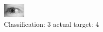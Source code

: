 \begin{figure}[h!]
\begin{center}
\includegraphics[width=0.60\columnwidth]{figures/ID3118_class_3_target_4.png}
\end{center}
\caption{ Classification: 3 actual target: 4}
\label{fig:ID3118_class_3_target_4}
\end{figure}
